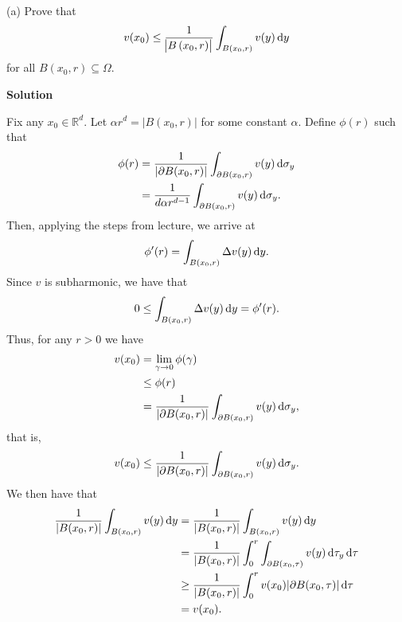 \documentclass{article}
\begin{document}
(a) Prove that
%
\begin{equation*}
    v(x_0) \leq \frac{1}{\envert{B\del{x_0, r}}} \int_{B(x_0, r)} v(y) \dif y
\end{equation*}
%
for all $B(x_0, r) \subseteq \Omega$.

\textbf{Solution}

Fix any $x_0 \in \mathbb{R}^d$. Let $\alpha r^{d} = |B
(x_0, r)|$ for some constant $\alpha$. Define $\phi(r)$ such that
%
\begin{align*}
    \phi(r)
        &= \frac{1}{|\partial B (x_0, r)|} \int_{\partial B (x_0, r)} v(y) \dif \sigma_y \\
        &= \frac{1}{d \alpha r^{d - 1}} \int_{\partial B (x_0, r)} v(y) \dif \sigma_y
        .
\end{align*}
%
Then, applying the steps from lecture, we arrive at
%
\begin{equation*}
    \phi^\prime(r) = \int_{B (x_0, r)} \Delta v(y) \dif y
        .
\end{equation*}
%
Since $v$ is subharmonic, we have that
%
\begin{equation*}
    0 \leq \int_{B (x_0, r)} \Delta v(y) \dif y = \phi^\prime(r)
    .
\end{equation*}
%
Thus, for any $r > 0$ we have
%
\begin{align*}
    v(x_0)
        &= \lim_{\gamma \to 0} \phi(\gamma) \\
        &\leq \phi(r) \\
        &= \frac{1}{|\partial B (x_0, r)|} \int_{\partial B (x_0, r)} v(y) \dif \sigma_y
    ,
\end{align*}
%
that is,
%
\begin{equation}
    v(x_0) \leq \frac{1}{|\partial B (x_0, r)|} \int_{\partial B (x_0, r)} v(y) \dif \sigma_y
    .
    \label{eq:2-partial}
\end{equation}
%
We then have that
%
\begin{align*}
    \frac{1}{|B (x_0, r)|} \int_{B (x_0, r)} v(y) \dif y
        &=\frac{1}{|B (x_0, r)|} \int_{B (x_0, r)} v(y) \dif y \\
        &=\frac{1}{|B (x_0, r)|} \int_0^r \int_{\partial B (x_0, \tau)} v(y) \dif \tau_y \dif \tau \\
        &\geq \frac{1}{|B (x_0, r)|} \int_0^r v(x_0) |\partial B (x_0, \tau)| \dif \tau \\
        &= v(x_0)
    .
\end{align*}

\vspace{5mm}
\end{document}
